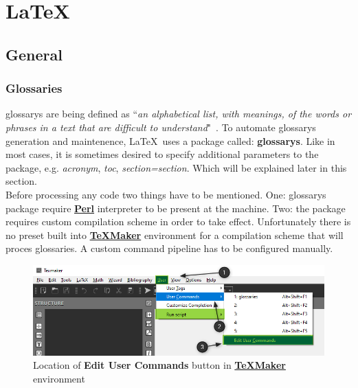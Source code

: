 \part{\LaTeX}

\chapter{General}

\section{Glossaries} \label{section:glossaries}

\Glspl{glossary} are being defined as ``\textit{an alphabetical list, with meanings, of the words or phrases in a text that are difficult to understand}"~\cite{cambridge_dictionary_glossary_definition}. To automate \glspl{glossary} generation and maintenence, \LaTeX\ uses a package called: \textbf{\glspl{glossary}}. Like in most cases, it is sometimes desired to specify additional \glspl{parameter} to the package, e.g. \textit{acronym}, \textit{toc}, \textit{section=section}. Which will be explained later in this section.\\

Before processing any code two things have to be mentioned. One: \glspl{glossary} package require \textbf{\href{https://www.perl.org/}{Perl}} interpreter to be present at the machine. Two: the package requires custom compilation scheme in order to take effect. Unfortunately there is no preset built into \textbf{\href{https://www.xm1math.net/texmaker/}{TeXMaker}} environment for a compilation scheme that will proces glossaries. A custom command \gls{pipeline} has to be configured manually.

\begin{figure}[H]
\centering
\includegraphics[scale=0.6]{content/LaTeX/figures/user_command_glossaries_marked.png}
\caption{Location of \textbf{Edit User Commands} button in \textbf{\href{https://www.xm1math.net/texmaker/}{TeXMaker}} environment}
\end{figure}

